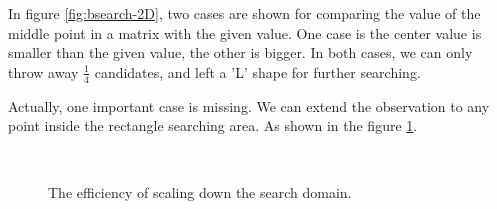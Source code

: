 \documentclass[UTF8]{article}
\begin{document}
In figure \ref{fig:bsearch-2D}, two cases are shown for comparing the value of the middle point in a matrix with the given value.
One case is the center value is smaller than the given value, the other is bigger. In both cases, we can only throw away
$\frac{1}{4}$ candidates, and left a 'L' shape for further searching.

Actually, one important case is missing. We can extend the observation to any point inside the rectangle searching area.
As shown in the figure \ref{fig:saddleback-drop}.

\begin{figure}[htbp]
 \centering
  \\
 \caption{The efficiency of scaling down the search domain.}
 \label{fig:saddleback-drop}
\end{figure}
\end{document}
